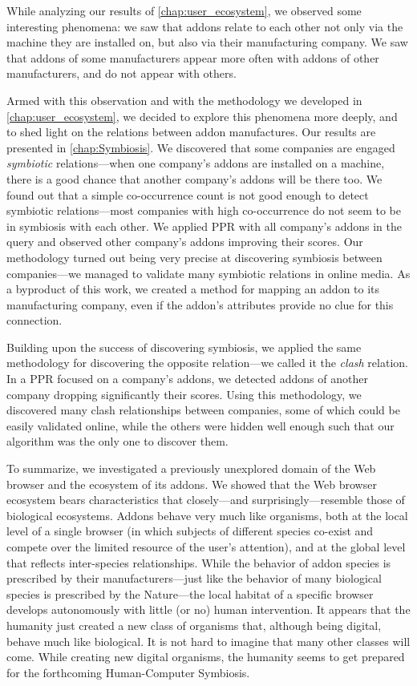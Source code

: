 \documentclass[ijoc,nonblindrev]{informs3} %
\numberwithin{equation}{subsection}
\begin{document}
While analyzing our results of \autoref{chap:user_ecosystem}, we observed some interesting phenomena: we saw that addons relate to each other not only via the machine they are installed on, but also via their manufacturing company. We saw that addons of some manufacturers appear more often with addons of other manufacturers, and do not appear with others.

Armed with this observation and with the methodology we developed in \autoref{chap:user_ecosystem}, we decided to explore this phenomena more deeply, and to shed light on the relations between addon manufactures. Our results are presented in \autoref{chap:Symbiosis}.
We discovered that some companies are engaged \emph{symbiotic} relations---when one company's addons are installed on a machine, there is a good chance that another company's addons will be there too. We found out that a simple co-occurrence count is not good enough to detect symbiotic relations---most companies with high co-occurrence do not seem to be in symbiosis with each other. We applied PPR with all company's addons in the query and observed other company's addons improving their scores. Our methodology turned out being very precise at discovering symbiosis between companies---we managed to validate many symbiotic relations in online media. As a byproduct of this work, we created a method for mapping an addon to its manufacturing company, even if the addon's attributes provide no clue for this connection.

Building upon the success of discovering symbiosis, we applied the same methodology for discovering the opposite relation---we called it the \emph{clash} relation. In a PPR focused on a company's addons, we detected addons of another company dropping significantly their scores. Using this methodology, we discovered many clash relationships between companies, some of which could be easily validated online, while the others were hidden well enough such that our algorithm was the only one to discover them.

To summarize, we investigated a previously unexplored domain of the Web browser and the ecosystem of its addons. We showed that the Web browser ecosystem bears characteristics that closely---and surprisingly---resemble those of biological ecosystems. Addons behave very much like organisms, both at the local level of a single browser (in which subjects of different species co-exist and compete over the limited resource of the user's attention), and at the global level that reflects inter-species relationships. While the behavior of addon species is prescribed by their manufacturers---just like the behavior of many biological species is prescribed by the Nature---the local habitat of a specific browser develops autonomously with little (or no) human intervention. It appears that the humanity just created a new class of organisms that, although being digital, behave much like biological. It is not hard to imagine that many other classes will come. While creating new digital organisms, the humanity seems to get prepared for the forthcoming Human-Computer Symbiosis.

\newpage
{} \label{Bibliography}


\end{document}
